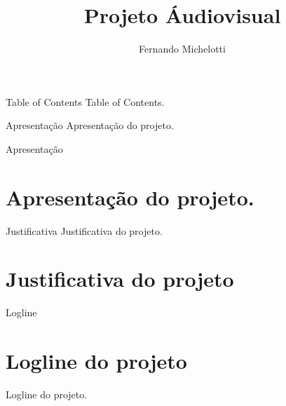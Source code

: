 \documentclass[aspectratio=169]{beamer}
\author{Fernando Michelotti}
\title{Projeto Áudiovisual}
\institute{Pinha Cultural}
\begin{document}
\begin{frame}
\titlepage
\end{frame}

\begin{frame}{Table of Contents}
Table of Contents.
\tableofcontents
\end{frame}

\begin{frame}{Apresentação}
Apresentação do projeto.
\end{frame}

\begin{frame}{Apresentação}
\section{Apresentação do projeto.}
\end{frame}

\begin{frame}{Justificativa}
Justificativa do projeto.
\section{Justificativa do projeto}
\end{frame}

\begin{frame}{Logline}
\section{Logline do projeto}
Logline do projeto.
\end{frame}
\end{document}
